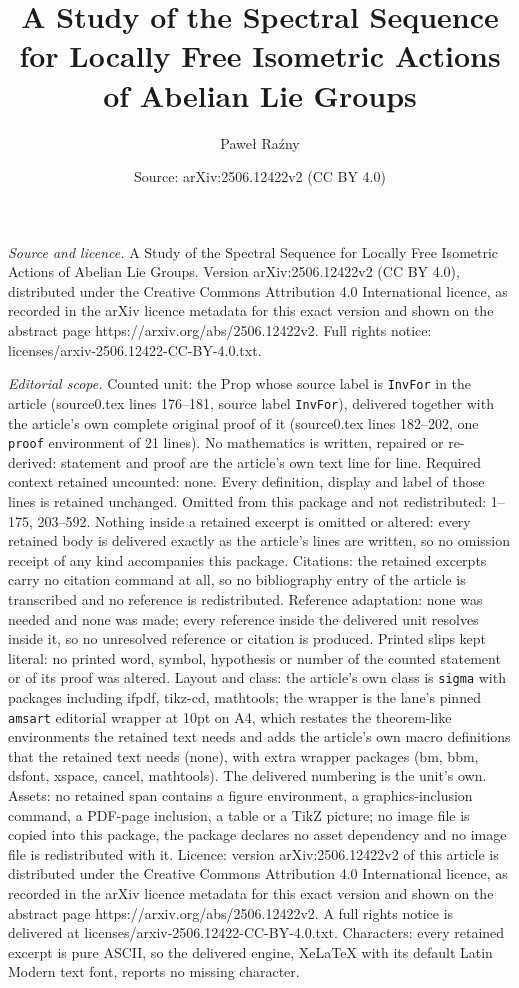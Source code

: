 \documentclass[10pt,a4paper]{amsart}
\title[A Study of the Spectral Sequence for Locally Free Isometric ]{A Study of the Spectral Sequence for Locally Free Isometric Actions of Abelian Lie Groups}
\author{Pawe{\l} Ra\'zny}
\date{Source: arXiv:2506.12422v2 (CC BY 4.0)}
\begin{document}
\maketitle

\noindent\emph{Source and licence.} A Study of the Spectral Sequence for Locally Free Isometric Actions of Abelian Lie Groups. Version arXiv:2506.12422v2 (CC BY 4.0), distributed under the Creative Commons Attribution 4.0 International licence, as recorded in the arXiv licence metadata for this exact version and shown on the abstract page https://arxiv.org/abs/2506.12422v2. Full rights notice: licenses/arxiv-2506.12422-CC-BY-4.0.txt.\par\smallskip

\noindent\textit{Editorial scope.} Counted unit: the Prop whose source label is \texttt{InvFor} in the article (source0.tex lines 176--181, source label \texttt{InvFor}), delivered together with the article's own complete original proof of it (source0.tex lines 182--202, one \texttt{proof} environment of 21 lines). No mathematics is written, repaired or re-derived: statement and proof are the article's own text line for line. Required context retained uncounted: none. Every definition, display and label of those lines is retained unchanged. Omitted from this package and not redistributed: 1--175, 203--592. Nothing inside a retained excerpt is omitted or altered: every retained body is delivered exactly as the article's lines are written, so no omission receipt of any kind accompanies this package. Citations: the retained excerpts carry no citation command at all, so no bibliography entry of the article is transcribed and no reference is redistributed. Reference adaptation: none was needed and none was made; every reference inside the delivered unit resolves inside it, so no unresolved reference or citation is produced. Printed slips kept literal: no printed word, symbol, hypothesis or number of the counted statement or of its proof was altered. Layout and class: the article's own class is \texttt{sigma} with packages including ifpdf, tikz-cd, mathtools; the wrapper is the lane's pinned \texttt{amsart} editorial wrapper at 10pt on A4, which restates the theorem-like environments the retained text needs and adds the article's own macro definitions that the retained text needs (none), with extra wrapper packages (bm, bbm, dsfont, xspace, cancel, mathtools). The delivered numbering is the unit's own. Assets: no retained span contains a figure environment, a graphics-inclusion command, a PDF-page inclusion, a table or a TikZ picture; no image file is copied into this package, the package declares no asset dependency and no image file is redistributed with it. Licence: version arXiv:2506.12422v2 of this article is distributed under the Creative Commons Attribution 4.0 International licence, as recorded in the arXiv licence metadata for this exact version and shown on the abstract page https://arxiv.org/abs/2506.12422v2. A full rights notice is delivered at licenses/arxiv-2506.12422-CC-BY-4.0.txt. Characters: every retained excerpt is pure ASCII, so the delivered engine, XeLaTeX with its default Latin Modern text font, reports no missing character.
\end{document}
